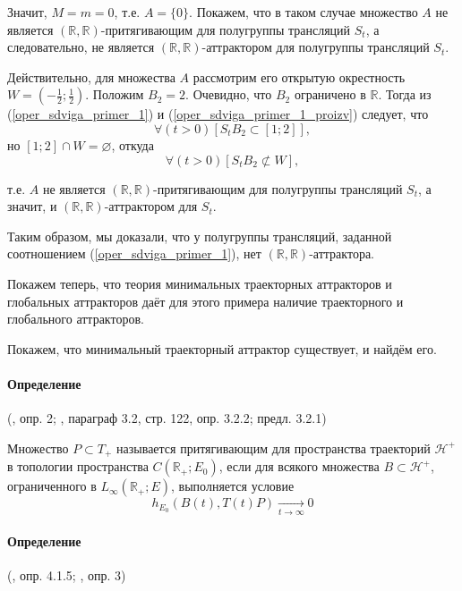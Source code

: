 Значит, $M=m=0$, т.е. $A=\{0\}$.
Покажем, что в таком случае множество $A$ не является $(\mathbb{R},\mathbb{R})$-притягивающим для полугруппы трансляций $S_t$, а следовательно, не является $(\mathbb{R},\mathbb{R})$-аттрактором для полугруппы трансляций $S_t$.

Действительно, для множества $A$ рассмотрим его открытую окрестность $ W = (-\frac12;\frac12)$.
Положим $B_2={2}$.
Очевидно, что $B_2$ ограничено в $\mathbb{R}$.
Тогда из (\ref{oper_sdviga_primer_1}) и (\ref{oper_sdviga_primer_1_proizv}) следует, что
$$
	\forall(t>0)[S_t B_2 \subset [1; 2]],
$$
но $[1;2]\cap W = \varnothing$, откуда
$$
	\forall(t>0)[S_t B_2 \not\subset W],
$$

т.е. $A$ не является $(\mathbb{R},\mathbb{R})$-притягивающим для полугруппы трансляций $S_t$,
а значит, и $(\mathbb{R},\mathbb{R})$-аттрактором для $S_t$.

Таким образом, мы доказали, что у полугруппы трансляций, заданной соотношением (\ref{oper_sdviga_primer_1}),
нет $(\mathbb{R},\mathbb{R})$-аттрактора.

Покажем теперь, что теория минимальных траекторных аттракторов и глобальных аттракторов
даёт для этого примера наличие траекторного и глобального аттракторов.



Покажем, что минимальный траекторный аттрактор существует, и найдём его.

\paragraph{Определение} (\cite{zhidkosti_s_pamyatyu}, опр. 2; \cite{Zelenaya}, параграф 3.2, стр. 122, опр. 3.2.2; предл. 3.2.1)

Множество $P \subset T_+$ называется притягивающим для пространства траекторий $\mathcal{H}^+$ в топологии пространства $C(\mathbb{R}_+; E_0)$,
если для всякого множества $B \subset \mathcal{H}^+$, ограниченного в $L_{\infty}(\mathbb{R}_+;E)$, выполняется условие
\begin{equation}
	h_{E_0}(B(t),T(t)P) \xrightarrow[t\to\infty]{}0
\end{equation}

\paragraph{Определение} (\cite{Zelenaya}, опр. 4.1.5; \cite{zhidkosti_s_pamyatyu}, опр. 3)

